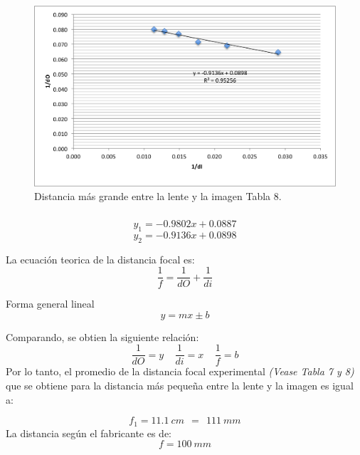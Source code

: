\documentclass{article}
\begin{document}
\begin{center}
\begin{figure}[!ht]
    \centering
    \includegraphics[width=1\textwidth]{3.png}
    \caption{Distancia más grande entre la lente y la imagen Tabla 8.}
    \label{fig:my_label}
\end{figure}
\end{center}

\subsubsection{}
\begin{equation}
    y_{1}=-0.9802x+0.0887
\end{equation}
\begin{equation}
    y_{2}=-0.9136x+0.0898
\end{equation}

La ecuación teorica de la distancia focal es:
\begin{equation}
    \frac{1}{f}=\frac{1}{dO}+\frac{1}{di}
\end{equation}

Forma general lineal
\begin{equation}
    y=mx\pm b
\end{equation}

Comparando, se obtien la siguiente relación:
\begin{equation}
    \frac{1}{dO}=y \ \ \ \ \ \frac{1}{di}=x \ \ \ \ \ \frac{1}{f}=b
\end{equation}
Por lo tanto, el promedio de la distancia focal experimental \emph{(Vease Tabla 7 y 8)} que se obtiene para la distancia más pequeña entre la lente y la imagen es igual a:

\begin{equation}
    f_{1}=11.1 \ cm \ \ = \ \ 111 \ mm
\end{equation}
La distancia según el fabricante es de:
\begin{equation}
    f=100 \ mm
\end{equation}
\end{document}
